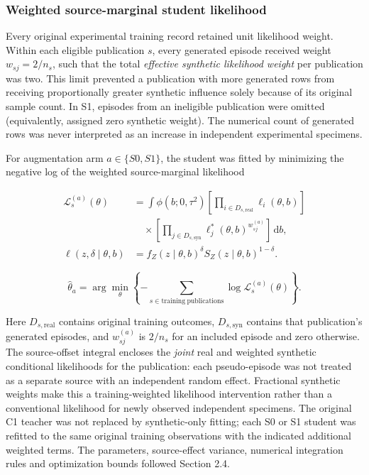 \documentclass[12pt,a4paper]{article}
\begin{document}
\subsubsection{Weighted source-marginal student likelihood}

Every original experimental training record retained unit likelihood weight. Within each eligible publication \(s\), every generated episode received weight \(w_{sj}=2/n_s\), such that the total \emph{effective synthetic likelihood weight} per publication was two. This limit prevented a publication with more generated rows from receiving proportionally greater synthetic influence solely because of its original sample count. In S1, episodes from an ineligible publication were omitted (equivalently, assigned zero synthetic weight). The numerical count of generated rows was never interpreted as an increase in independent experimental specimens.

For augmentation arm \(a\in\{S0,S1\}\), the student was fitted by minimizing the negative log of the weighted source-marginal likelihood

\begin{equation}
\begin{aligned}
\mathcal{L}_{s}^{(a)}(\theta)
&= \int \phi(b;0,\tau^2)
\left[\prod_{i\in D_{s,\mathrm{real}}}\ell_i(\theta,b)\right]\\
&\quad\times
\left[\prod_{j\in D_{s,\mathrm{syn}}}
\ell_j^{*}(\theta,b)^{w_{sj}^{(a)}}\right]\,\mathrm{d}b,\\
\ell(z,\delta\mid\theta,b)
&=f_Z(z\mid\theta,b)^{\delta}
S_Z(z\mid\theta,b)^{1-\delta}.
\end{aligned}
\tag{2.5d}
\end{equation}

\begin{equation}
\widehat{\theta}_{a}
=\arg\min_{\theta}
\left\{-\sum_{s\in\mathrm{training\ publications}}
\log\mathcal{L}_{s}^{(a)}(\theta)\right\}.
\tag{2.5e}
\end{equation}

Here \(D_{s,\mathrm{real}}\) contains original training outcomes, \(D_{s,\mathrm{syn}}\) contains that publication's generated episodes, and \(w_{sj}^{(a)}\) is \(2/n_s\) for an included episode and zero otherwise. The source-offset integral encloses the \emph{joint} real and weighted synthetic conditional likelihoods for the publication: each pseudo-episode was not treated as a separate source with an independent random effect. Fractional synthetic weights make this a training-weighted likelihood intervention rather than a conventional likelihood for newly observed independent specimens. The original C1 teacher was not replaced by synthetic-only fitting; each S0 or S1 student was refitted to the same original training observations with the indicated additional weighted terms. The parameters, source-effect variance, numerical integration rules and optimization bounds followed Section 2.4.
\end{document}

